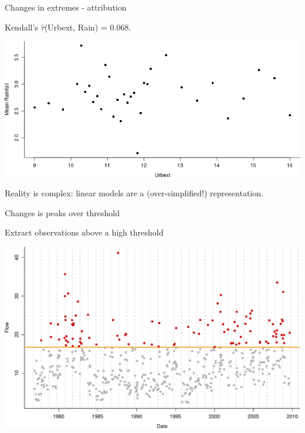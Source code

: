 \documentclass[
  10pt,
  ignorenonframetext,
  compress]{beamer}
\begin{document}
\begin{frame}{Changes in extremes - attribution}
\protect\hypertarget{changes-in-extremes---attribution}{}

Kendall's \(\hat{\tau}\)(Urbext, Rain) = 0.068.

\includegraphics{ProsdocimiPerugia_files/figure-beamer/urbAndRain-1.png}

\pause

Reality is complex: linear models are a (over-simplified!)
representation.

\end{frame}

\begin{frame}{Changes is peaks over threshold}
\protect\hypertarget{changes-is-peaks-over-threshold}{}

Extract observations above a high threshold

\includegraphics{ProsdocimiPerugia_files/figure-beamer/unnamed-chunk-5-1.pdf}

\end{frame}
\end{document}
